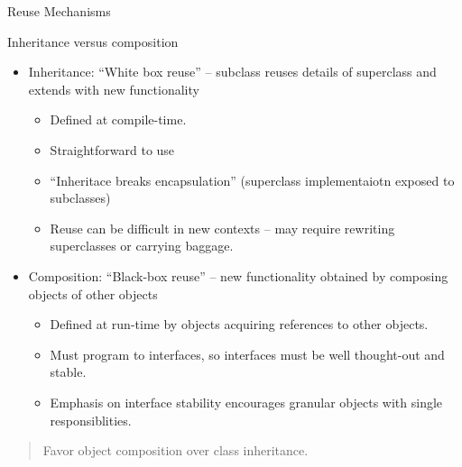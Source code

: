 \documentclass{beamer}
\begin{document}
\begin{frame}[fragile]{Reuse Mechanisms}


Inheritance versus composition
\begin{itemize}
\item Inheritance: ``White box reuse''  -- subclass reuses details of superclass and extends with new functionality
\begin{itemize}
\item Defined at compile-time.
\item Straightforward to use
\item ``Inheritace breaks encapsulation'' (superclass implementaiotn exposed to subclasses)
\item Reuse can be difficult in new contexts -- may require rewriting superclasses or carrying baggage.
\end{itemize}
\item Composition: ``Black-box reuse'' -- new functionality obtained by composing objects of other objects
\begin{itemize}
\item Defined at run-time by objects acquiring references to other objects.
\item Must program to interfaces, so interfaces must be well thought-out and stable.
\item Emphasis on interface stability encourages granular objects with single responsiblities.
\end{itemize}
\end{itemize}

\begin{quote}
Favor object composition over class inheritance.
\end{quote}



\end{frame}
\end{document}
